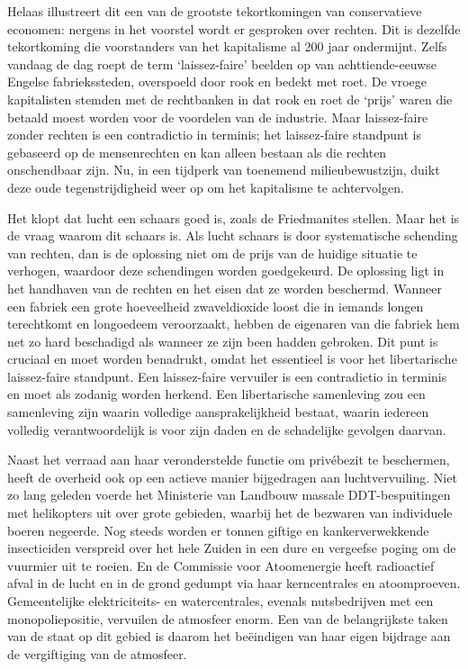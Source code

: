 \documentclass[
  a5paper,
  smalldemyvopaper,10pt,twoside,onecolumn,openright,extrafontsizes,hidelinks]{memoir}
\renewenvironment{quote}%
               {\list{}{\rightmargin=.6cm\leftmargin=.6cm}%
                \itshape \item[]}%
               {\endlist}
\begin{document}
\begin{quote}
Helaas illustreert dit een van de grootste tekortkomingen van
conservatieve economen: nergens in het voorstel wordt er gesproken over
rechten. Dit is dezelfde tekortkoming die voorstanders van het
kapitalisme al 200 jaar ondermijnt. Zelfs vandaag de dag roept de term
`laissez-faire' beelden op van achttiende-eeuwse Engelse fabriekssteden,
overspoeld door rook en bedekt met roet. De vroege kapitalisten stemden
met de rechtbanken in dat rook en roet de `prijs' waren die betaald
moest worden voor de voordelen van de industrie. Maar laissez-faire
zonder rechten is een contradictio in terminis; het laissez-faire
standpunt is gebaseerd op de mensenrechten en kan alleen bestaan als die
rechten onschendbaar zijn. Nu, in een tijdperk van toenemend
milieubewustzijn, duikt deze oude tegenstrijdigheid weer op om het
kapitalisme te achtervolgen.

Het klopt dat lucht een schaars goed is, zoals de Friedmanites stellen.
Maar het is de vraag waarom dit schaars is. Als lucht schaars is door
systematische schending van rechten, dan is de oplossing niet om de
prijs van de huidige situatie te verhogen, waardoor deze schendingen
worden goedgekeurd. De oplossing ligt in het handhaven van de rechten en
het eisen dat ze worden beschermd. Wanneer een fabriek een grote
hoeveelheid zwaveldioxide loost die in iemands longen terechtkomt en
longoedeem veroorzaakt, hebben de eigenaren van die fabriek hem net zo
hard beschadigd als wanneer ze zijn been hadden gebroken. Dit punt is
cruciaal en moet worden benadrukt, omdat het essentieel is voor het
libertarische laissez-faire standpunt. Een laissez-faire vervuiler is
een contradictio in terminis en moet als zodanig worden herkend. Een
libertarische samenleving zou een samenleving zijn waarin volledige
aansprakelijkheid bestaat, waarin iedereen volledig verantwoordelijk is
voor zijn daden en de schadelijke gevolgen daarvan.
\end{quote}

Naast het verraad aan haar veronderstelde functie om privébezit te
beschermen, heeft de overheid ook op een actieve manier bijgedragen aan
luchtvervuiling. Niet zo lang geleden voerde het Ministerie van Landbouw
massale DDT-bespuitingen met helikopters uit over grote gebieden,
waarbij het de bezwaren van individuele boeren negeerde. Nog steeds
worden er tonnen giftige en kankerverwekkende insecticiden verspreid
over het hele Zuiden in een dure en vergeefse poging om de vuurmier uit
te roeien. En de Commissie voor Atoomenergie heeft radioactief afval in
de lucht en in de grond gedumpt via haar kerncentrales en atoomproeven.
Gemeentelijke elektriciteits- en watercentrales, evenals nutsbedrijven
met een monopoliepositie, vervuilen de atmosfeer enorm. Een van de
belangrijkste taken van de staat op dit gebied is daarom het beëindigen
van haar eigen bijdrage aan de vergiftiging van de atmosfeer.
\end{document}
